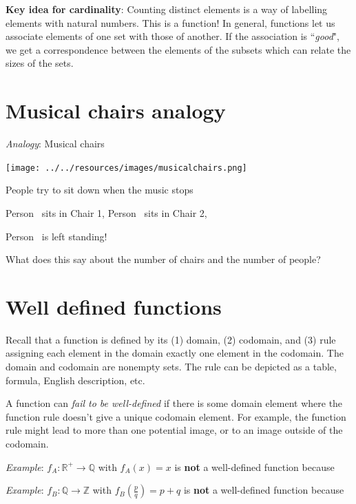 \documentclass[12pt, oneside]{article}
\begin{document}
{\bf Key idea for cardinality}: Counting 
distinct elements is a way of labelling elements
with natural numbers. This is a function!
In general, functions let us 
associate elements of one set with those
of another. If the association is ``{\it good}", 
we get a correspondence between the elements of the subsets
which can relate the sizes of the sets. \vfill
\section*{Musical chairs analogy}


{\it Analogy}: Musical chairs

\begin{multicols}{2}
\texttt{[image: ../../resources/images/musicalchairs.png]}
\columnbreak

People try to sit down when the music stops

Person\sun~ sits in Chair 1,
Person\smiley~ sits in Chair 2,

Person\frownie~  is left standing!
\end{multicols}
What does this say about the number of chairs and the number of people?

\vspace{100pt} \vfill
\section*{Well defined functions}


Recall that a function is defined by its (1) domain, (2) codomain, and (3) rule assigning each 
element in the domain exactly one element in the codomain. 
The domain and codomain are nonempty sets.
The rule can be depicted as a table, formula, English description, etc.

A function can {\it fail to be well-defined} if there is some 
domain element where the function rule doesn't give a
unique codomain element. For example, the function rule might lead to 
more than one potential image, or to an image outside of the codomain.


{\it Example}: $f_A: \mathbb{R}^+ \to \mathbb{Q}$ with $f_A(x) = x$ is {\bf not} a well-defined function because

\vspace{100pt}


{\it Example}: $f_B: \mathbb{Q} \to \mathbb{Z}$ with $f_B\left(\frac{p}{q}\right) = p+q$ is {\bf not} a well-defined function because

\vspace{100pt}
\end{document}
